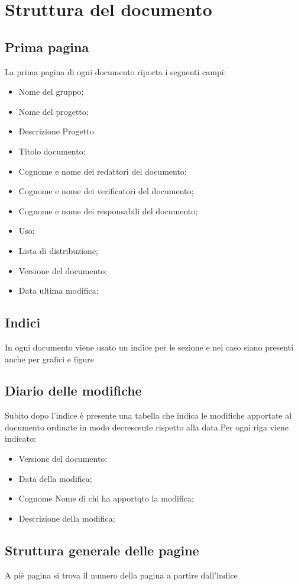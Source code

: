 \documentclass[a4paper]{report}
\begin{document}
	\section{Struttura del documento}
	\subsection{Prima pagina}
	La prima pagina di ogni documento riporta i seguenti campi:
	\begin{itemize}
		\item Nome del gruppo;
		\item Nome del progetto;
		\item Descrizione Progetto
		\item Titolo documento;
		\item Cognome e nome dei redattori del documento;
		\item Cognome e nome dei verificatori del documento;
		\item Cognome e nome dei responsabili del documento;
		\item Uso;
		\item Lista di distribuzione;
		\item Versione del documento;
		\item Data ultima modifica;
	\end{itemize}
	\subsection{Indici}
	In ogni documento viene usato un indice per le sezione e nel caso siano presenti anche per grafici e figure  
	\subsection{Diario delle modifiche}
	Subito dopo l'indice è presente una tabella che indica le modifiche apportate al documento ordinate in modo decrescente rispetto alla data.Per ogni riga viene indicato:
	\begin{itemize}
		\item Versione del documento;
		\item Data della modifica;
		\item Cognome Nome di chi ha apportqto la modifica;
		\item Descrizione della modifica;
	\end{itemize}
	\subsection{Struttura generale delle pagine}
	A piè pagina si trova il numero della pagina a partire dall'indice
\end{document}
